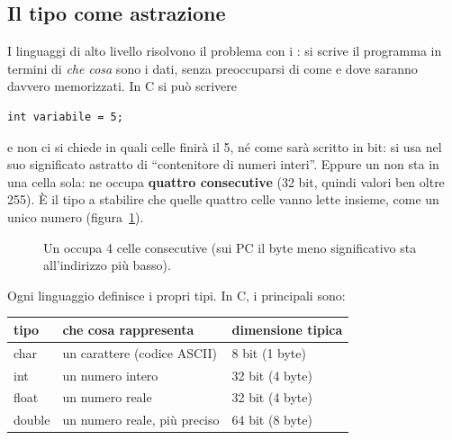 \subsection{Il tipo come astrazione}

I linguaggi di alto livello risolvono il problema con i : si scrive il programma in termini di \textit{che cosa} sono i dati,
senza preoccuparsi di come e dove saranno davvero memorizzati. In C si può
scrivere

\begin{lstlisting}[style=c]
int variabile = 5;
\end{lstlisting}

e non ci si chiede in quali celle finirà il 5, né come sarà scritto in bit:
si usa  nel suo significato astratto di “contenitore di numeri
interi”. Eppure un  non sta in una cella sola: ne occupa
\textbf{quattro consecutive} (32 bit, quindi valori ben oltre 255). È il
tipo a stabilire che quelle quattro celle vanno lette insieme, come un
unico numero (figura~\ref{fig:int4}).

\begin{figure}[H]
  \centering
  \caption{Un  occupa 4 celle consecutive (sui PC il byte meno
           significativo sta all'indirizzo più basso).}
  \label{fig:int4}
\end{figure}

Ogni linguaggio definisce i propri tipi. In C, i principali sono:

\begin{center}
\renewcommand{\arraystretch}{1.3}
\begin{tabular}{@{}>{\FiraCodeNL}l l l@{}}
  \toprule
  \normalfont\textbf{tipo} & \textbf{che cosa rappresenta} & \textbf{dimensione tipica} \\
  \midrule
  char   & un carattere (codice ASCII)     & 8 bit (1 byte) \\
  int    & un numero intero                & 32 bit (4 byte) \\
  float  & un numero reale                 & 32 bit (4 byte) \\
  double & un numero reale, più preciso    & 64 bit (8 byte) \\
  \bottomrule
\end{tabular}
\end{center}

